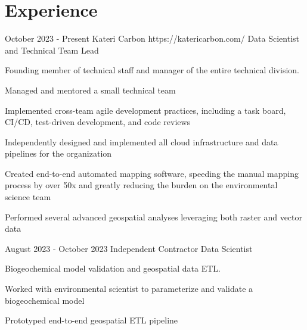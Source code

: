 \documentclass[10pt]{article}
\begin{document}
\section{Experience}
	\job %
		{October 2023 - Present}
		{Kateri Carbon}
		{}
		{https://katericarbon.com/}
		{Data Scientist and Technical Team Lead}
		{Founding member of technical staff and manager of the entire technical division.\\

		\vspace{-7pt}
		\begin{itemize-noindent}
			\vspace{7pt}
			\item Managed and mentored a small technical team
			\item Implemented cross-team agile development practices, including a task board, CI/CD, test-driven development, and code reviews
			\item Independently designed and implemented all cloud infrastructure and data pipelines for the organization
			\item Created end-to-end automated mapping software, speeding the manual mapping process by over 50x and greatly reducing the burden on the environmental science team
			\item Performed several advanced geospatial analyses leveraging both raster and vector data
		\end{itemize-noindent}}

	\job %
		{August 2023 - October 2023}
		{Independent Contractor}
		{}
		{}
		{Data Scientist}
		{Biogeochemical model validation and geospatial data ETL.\\

		\vspace{-7pt}
		\begin{itemize-noindent}
			\vspace{7pt}
			\item Worked with environmental scientist to parameterize and validate a biogeochemical model
			\item Prototyped end-to-end geospatial ETL pipeline
		\end{itemize-noindent}}
	
\end{document}
